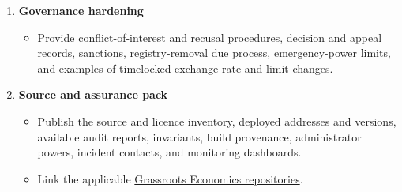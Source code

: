 \documentclass[11pt]{article}
\begin{document}
\begin{enumerate}[leftmargin=*]
\begin{itemize}[leftmargin=*]
\item Document jurisdiction strategy, voucher classes, cash-equivalent policies, KYC or attestation options, geofencing, consumer disclosures, mis-selling controls, and the distinction between an ordinary Pool swap and an express credit product.
\item Link the effective \href{https://docs.cosmolocal.credit/governance/terms}{Cosmo-Local Credit Terms of Service} and preserve superseded versions through controlled records.
\end{itemize}
\item \textbf{Governance hardening}
\begin{itemize}[leftmargin=*]
\item Provide conflict-of-interest and recusal procedures, decision and appeal records, sanctions, registry-removal due process, emergency-power limits, and examples of timelocked exchange-rate and limit changes.
\end{itemize}
\item \textbf{Source and assurance pack}
\begin{itemize}[leftmargin=*]
\item Publish the source and licence inventory, deployed addresses and versions, available audit reports, invariants, build provenance, administrator powers, incident contacts, and monitoring dashboards.
\item Link the applicable \href{https://github.com/grassrootseconomics}{Grassroots Economics repositories}.
\end{itemize}
\end{enumerate}
\end{document}
